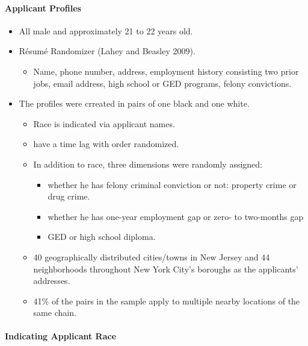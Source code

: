 \documentclass[../root]{subfiles}
\begin{document}
    \paragraph{Applicant Profiles}

    \begin{itemize}
      \item All male and approximately 21 to 22 years old.
      \item R\'{e}sum\'{e} Randomizer (Lahey and Beasley 2009).
      \begin{itemize}
        \item Name, phone number, address, employment history consisting two prior jobs, email address, high school or GED programs, felony convictions.
      \end{itemize}
      \item The profiles were crreated in pairs of one black and one white.
      \begin{itemize}
        \item Race is indicated via applicant names.
        \item have a time lag with order randomized.
        \item In addition to race, three dimensions were randomly assigned:
        \begin{itemize}
          \item whether he has felony criminal conviction or not: property crime or drug crime.
          \item whether he has one-year employment gap or zero- to two-months gap
          \item GED or high school diploma.
        \end{itemize}
        \item 40 geographically distributed cities/towns in New Jersey and 44 neighborhoods throughout New York City's boroughs as the applicants' addresses.
        \item 41\% of the pairs in the sample apply to multiple nearby locations of the same chain.
      \end{itemize}
    \end{itemize}

    \paragraph{Indicating Applicant Race}
\end{document}
